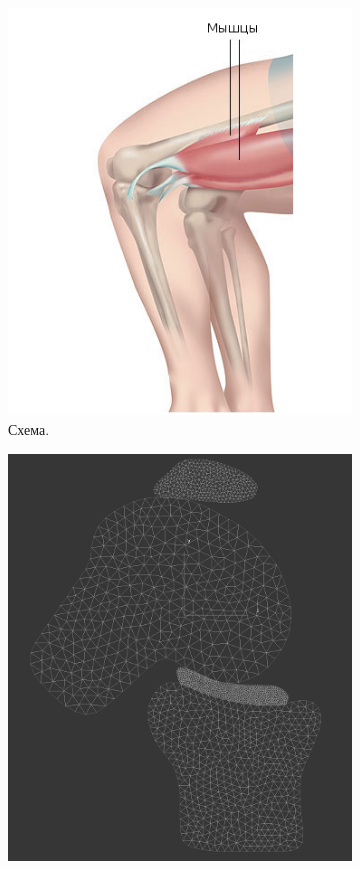 \begin{figure}[h]
\centering
\begin{subfigure}[b]{0.4\textwidth}
\centering
\includegraphics[width=\textwidth]{png/cranium/knee-strike.png}
\caption{Схема.}
\end{subfigure}
\begin{subfigure}[b]{0.4\textwidth}
\centering
\includegraphics[width=\textwidth]{png/cranium/knee-mesh.png}

\end{subfigure}
\end{figure}
